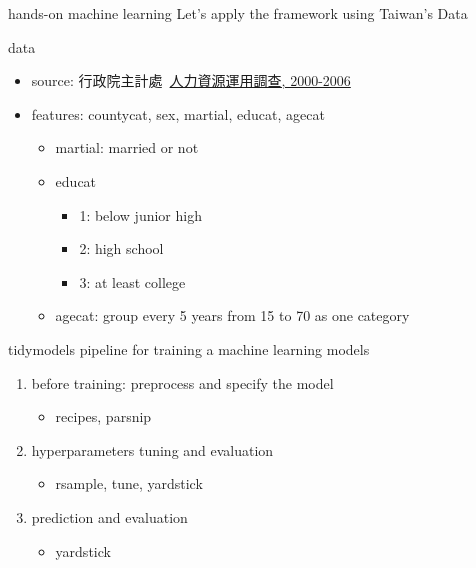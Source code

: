 \documentclass[
  ignorenonframetext,
]{beamer}
\begin{document}
\begin{frame}{hands-on machine learning}
  Let's apply the framework using Taiwan's Data
\end{frame}


\begin{frame}{data}
  \begin{itemize}
    \item source: 行政院主計處\ \href{https://srda.sinica.edu.tw/browsingbydatatype_result.php?category=surveymethod&type=4&csid=31}{人力資源運用調查, 2000-2006}
    \item features: countycat, sex, martial, educat, agecat
    \begin{itemize}
      \item martial: married or not
      \item educat
      \begin{itemize}
        \item 1: below junior high
        \item 2: high school
        \item 3: at least college
      \end{itemize}
      \item agecat: group every 5 years from 15 to 70 as one category
    \end{itemize}
  \end{itemize}
\end{frame}


\begin{frame}{tidymodels}
  pipeline for training a machine learning models
  \begin{enumerate}
    \item before training: preprocess and specify the model
    \begin{itemize}
      \item recipes, parsnip
    \end{itemize}
    \item hyperparameters tuning and evaluation
    \begin{itemize}
      \item rsample, tune, yardstick
    \end{itemize}
    \item prediction and evaluation
    \begin{itemize}
      \item yardstick
    \end{itemize}
  \end{enumerate}
\end{frame}
\end{document}
